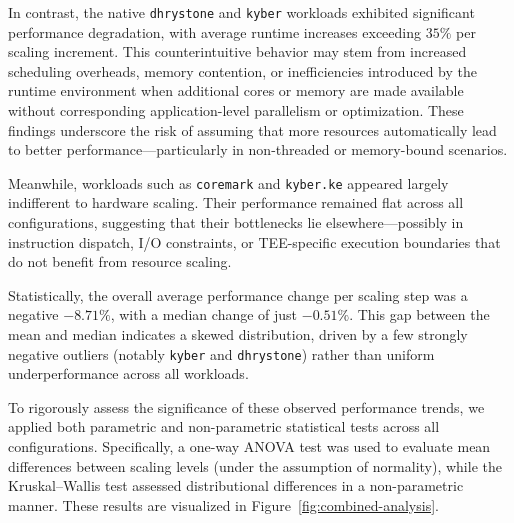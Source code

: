 In contrast, the native \texttt{dhrystone} and \texttt{kyber} workloads exhibited significant performance degradation, with average runtime increases exceeding $35\%$ per scaling increment. This counterintuitive behavior may stem from increased scheduling overheads, memory contention, or inefficiencies introduced by the runtime environment when additional cores or memory are made available without corresponding application-level parallelism or optimization. These findings underscore the risk of assuming that more resources automatically lead to better performance—particularly in non-threaded or memory-bound scenarios.

Meanwhile, workloads such as \texttt{coremark} and \texttt{kyber.ke} appeared largely indifferent to hardware scaling. Their performance remained flat across all configurations, suggesting that their bottlenecks lie elsewhere—possibly in instruction dispatch, I/O constraints, or TEE-specific execution boundaries that do not benefit from resource scaling.

Statistically, the overall average performance change per scaling step was a negative $-8.71\%$, with a median change of just $-0.51\%$. This gap between the mean and median indicates a skewed distribution, driven by a few strongly negative outliers (notably \texttt{kyber} and \texttt{dhrystone}) rather than uniform underperformance across all workloads.

To rigorously assess the significance of these observed performance trends, we applied both parametric and non-parametric statistical tests across all configurations. Specifically, a one-way ANOVA test was used to evaluate mean differences between scaling levels (under the assumption of normality), while the Kruskal–Wallis test assessed distributional differences in a non-parametric manner. These results are visualized in Figure~\ref{fig:combined-analysis}.

